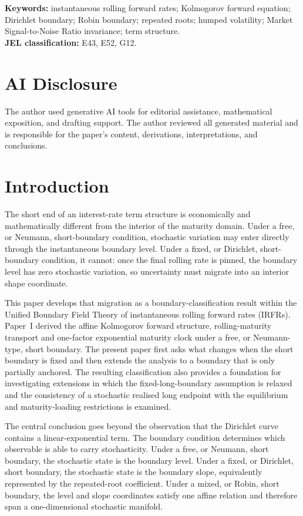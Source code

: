 \documentclass[12pt]{article}
\numberwithin{equation}{subsection}
\begin{document}
\noindent\textbf{Keywords:} instantaneous rolling forward rates; Kolmogorov forward equation; Dirichlet boundary; Robin boundary; repeated roots; humped volatility; Market Signal-to-Noise Ratio invariance; term structure.\\
\textbf{JEL classification:} E43, E52, G12.

\section*{AI Disclosure}
The author used generative AI tools for editorial assistance, mathematical exposition, and drafting support. The author reviewed all generated material and is responsible for the paper's content, derivations, interpretations, and conclusions.

\section{Introduction}

The short end of an interest-rate term structure is economically and mathematically different from the interior of the maturity domain. Under a free, or Neumann, short-boundary condition, stochastic variation may enter directly through the instantaneous boundary level. Under a fixed, or Dirichlet, short-boundary condition, it cannot: once the final rolling rate is pinned, the boundary level has zero stochastic variation, so uncertainty must migrate into an interior shape coordinate.

This paper develops that migration as a boundary-classification result within the Unified Boundary Field Theory of instantaneous rolling forward rates (IRFRs). Paper~I \cite{Oza2026} derived the affine Kolmogorov forward structure, rolling-maturity transport and one-factor exponential maturity clock under a free, or Neumann-type, short boundary. The present paper first asks what changes when the short boundary is fixed and then extends the analysis to a boundary that is only partially anchored. The resulting classification also provides a foundation for investigating extensions in which the fixed-long-boundary assumption is relaxed and the consistency of a stochastic realised long endpoint with the equilibrium and maturity-loading restrictions is examined.


The central conclusion goes beyond the observation that the Dirichlet curve contains a linear-exponential term. The boundary condition determines which observable is able to carry stochasticity. Under a free, or Neumann, short boundary, the stochastic state is the boundary level. Under a fixed, or Dirichlet, short boundary, the stochastic state is the boundary slope, equivalently represented by the repeated-root coefficient. Under a mixed, or Robin, short boundary, the level and slope coordinates satisfy one affine relation and therefore span a one-dimensional stochastic manifold.
\end{document}
